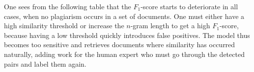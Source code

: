 One sees from the following table that the $F_1$-score starts to deteriorate in all cases, when no plagiarism occurs in a set of documents. One must either have a high similarity threshold or increase the $n$-gram length to get a high $F_1$-score, because having a low threshold quickly introduces false positives. The model thus becomes too sensitive and retrieves documents where similarity has occurred naturally, adding work for the human expert who must go through the detected pairs and label them again. 


\begin{table}[ht]
\centering
\caption{$F_1$-score for SOCO-C1, which contains no cases of plagiarism. False-positives are  introduced as the threshold gets lower.}
\label{tbl-sd-sococ1-fone}
\end{table}


